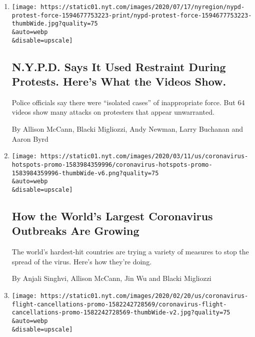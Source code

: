 \begin{enumerate}
\def\labelenumi{\arabic{enumi}.}
\item
  \href{/interactive/2020/07/14/nyregion/nypd-george-floyd-protests.html}{}

  \texttt{[image: https://static01.nyt.com/images/2020/07/17/nyregion/nypd-protest-force-1594677753223-print/nypd-protest-force-1594677753223-thumbWide.jpg?quality=75\\\&auto=webp\\\&disable=upscale]}

  \hypertarget{nypd-says-it-used-restraint-during-protests-heres-what-the-videos-show}{%
  \subsection{N.Y.P.D. Says It Used Restraint During Protests. Here's
  What the Videos
  Show.}\label{nypd-says-it-used-restraint-during-protests-heres-what-the-videos-show}}

  Police officials say there were ``isolated cases'' of inappropriate
  force. But 64 videos show many attacks on protesters that appear
  unwarranted.

  By Allison McCann, Blacki Migliozzi, Andy Newman, Larry Buchanan and
  Aaron Byrd
\item
  \href{/interactive/2020/world/coronavirus-maps-italy-iran-korea.html}{}

  \texttt{[image: https://static01.nyt.com/images/2020/03/11/us/coronavirus-hotspots-promo-1583984359996/coronavirus-hotspots-promo-1583984359996-thumbWide-v6.png?quality=75\\\&auto=webp\\\&disable=upscale]}

  \hypertarget{how-the-worlds-largest-coronavirus-outbreaks-are-growing}{%
  \subsection{How the World's Largest Coronavirus Outbreaks Are
  Growing}\label{how-the-worlds-largest-coronavirus-outbreaks-are-growing}}

  The world's hardest-hit countries are trying a variety of measures to
  stop the spread of the virus. Here's how they're doing.

  By Anjali Singhvi, Allison McCann, Jin Wu and Blacki Migliozzi
\item
  \href{/interactive/2020/02/21/business/coronavirus-airline-travel.html}{}

  \texttt{[image: https://static01.nyt.com/images/2020/02/20/us/coronavirus-flight-cancellations-promo-1582242728569/coronavirus-flight-cancellations-promo-1582242728569-thumbWide-v2.jpg?quality=75\\\&auto=webp\\\&disable=upscale]}


\end{enumerate}
